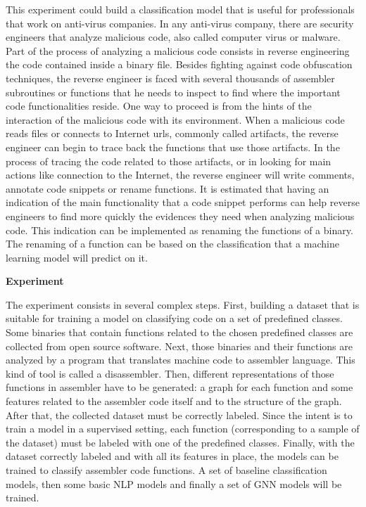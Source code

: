 This experiment could build a classification model that is useful for professionals that work on anti-virus companies. In any anti-virus company, there are security engineers that analyze malicious code, also called computer virus or malware. Part of the process of analyzing a malicious code consists in reverse engineering the code contained inside a binary file. Besides fighting against code obfuscation techniques, the reverse engineer is faced with several thousands of assembler subroutines or functions that he needs to inspect to find where the important code functionalities reside. One way to proceed is from the hints of the interaction of the malicious code with its environment. When a malicious code reads files or connects to Internet urls, commonly called artifacts, the reverse engineer can begin to trace back the functions that use those artifacts. In the process of tracing the code related to those artifacts, or in looking for main actions like connection to the Internet, the reverse engineer will write comments, annotate code snippets or rename functions.
It is estimated that having an indication of the main functionality that a code snippet performs can help reverse engineers to find more quickly the evidences they need when analyzing malicious code. This indication can be implemented as renaming the functions of a binary. The renaming of a function can be based on the classification that a machine learning model will predict on it.



\textbf{Experiment}

The experiment consists in several complex steps.
First, building a dataset that is suitable for training a model on classifying code on a set of predefined classes. Some binaries that contain functions related to the chosen predefined classes are collected from open source software.  
Next, those binaries and their functions are analyzed by a program that translates machine code to assembler language. This kind of tool is called a disassembler.
Then, different representations of those functions in assembler have to be generated: a graph for each function and some features related to the assembler code itself and to the structure of the graph.
After that, the collected dataset must be correctly labeled. Since the intent is to train a model in a supervised setting, each function (corresponding to a sample of the dataset) must be labeled with one of the predefined classes.
Finally, with the dataset correctly labeled and with all its features in place, the models can be trained to classify assembler code functions. A set of baseline classification models, then some basic NLP models and finally a set of GNN models will be trained. 

